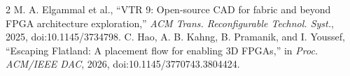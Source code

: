 \documentclass[conference,10pt]{IEEEtran}
\begin{document}
\begin{thebibliography}{2}
 M. A. Elgammal et al., ``VTR 9: Open-source CAD for fabric and beyond FPGA architecture exploration,'' \emph{ACM Trans. Reconfigurable Technol. Syst.}, 2025, doi:10.1145/3734798.
 C. Hao, A. B. Kahng, B. Pramanik, and I. Youssef, ``Escaping Flatland: A placement flow for enabling 3D FPGAs,'' in \emph{Proc. ACM/IEEE DAC}, 2026, doi:10.1145/3770743.3804424.
\end{thebibliography}
\end{document}
